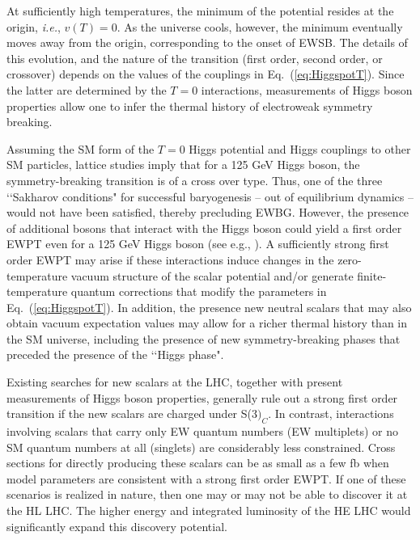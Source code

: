 At sufficiently high temperatures, the minimum of the potential resides at the origin, {\it i.e.}, $v(T) = 0$. As the universe cools, however, the minimum eventually moves away from the origin, corresponding to the onset of EWSB. The details of this evolution, and the nature of the transition (first order, second order, or crossover) depends on the values of the couplings in Eq.~(\ref{eq:HiggspotT}). Since the latter are determined by the $T=0$ interactions, measurements of Higgs boson properties allow one to infer the thermal history of electroweak symmetry breaking. 

Assuming the SM form of the $T=0$ Higgs potential and Higgs couplings to other SM particles, lattice studies imply that for a 125 GeV Higgs boson, the symmetry-breaking transition is of a cross over type\cite{Rummukainen:1998as,Csikor:1998eu,Laine:1998jb,Gurtler:1997hr}. Thus, one of the three \lq\lq Sakharov conditions" for successful baryogenesis\cite{Sakharov:1967dj} -- out of equilibrium dynamics -- would not have been satisfied, thereby precluding EWBG. However, the presence of additional bosons that interact with the Higgs boson could yield a first order EWPT even for a 125 GeV Higgs boson (see e.g., \cite{Morrissey:2012db,Assamagan:2016azc}). A sufficiently strong first order EWPT may arise if these interactions induce changes in the zero-temperature vacuum structure of the scalar potential and/or generate finite-temperature quantum corrections that modify the parameters in Eq.~(\eqref{eq:HiggspotT}). In addition, the presence new neutral scalars that may also obtain vacuum expectation values may allow for a richer thermal history than in the SM universe, including the presence of new symmetry-breaking phases that preceded the presence of the \lq\lq Higgs phase"\cite{Patel:2012pi,Patel:2013zla,Blinov:2015sna}. 

 Existing searches for new scalars at the LHC, together with present measurements of Higgs boson properties, generally rule out a strong first order transition if the new scalars are charged under S(3$)_C$\cite{Katz:2014bha,Katz:2015uja}. In contrast, interactions involving scalars that carry only EW quantum numbers (EW multiplets) or no SM quantum numbers at all (singlets) are considerably less constrained. Cross sections for directly producing these scalars can be as small as a few fb when model parameters are consistent with a strong first order EWPT. If one of these scenarios is realized in nature, then one may or may not be able to discover it at the HL LHC. The higher energy and integrated luminosity of the HE LHC would significantly expand this discovery potential. 

